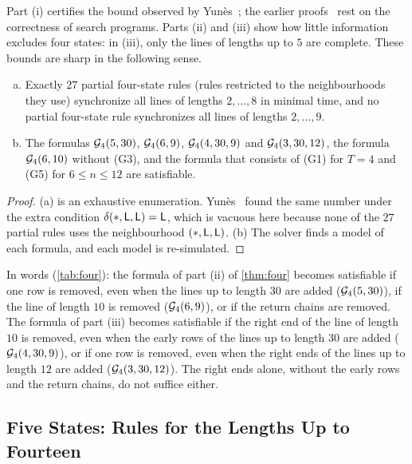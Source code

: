 Part (i) certifies the bound observed by Yun\`es~\cite{Yunes93}; the earlier
proofs~\cite{Balzer67,Yunes93,Sanders94} rest on the correctness of search
programs. Parts (ii) and (iii) show how little information excludes four
states: in (iii), only the lines of lengths up to $5$ are complete. These
bounds are sharp in the following sense.

\begin{proposition}\label{prop:sharp}
\leavevmode
\begin{enumerate}[(a)]
\item Exactly $27$ partial four-state rules (rules restricted to the
neighbourhoods they use) synchronize all lines of lengths $2,\dots,8$ in
minimal time, and no partial four-state rule synchronizes all lines of lengths
$2,\dots,9$.
\item The formulas $\mathcal G_4(5,30)$, $\mathcal G_4(6,9)$, $\mathcal G_4(4,30,9)$ and
$\mathcal G_4(3,30,12)$, the formula $\mathcal G_4(6,10)$ without (G3), and the formula that
consists of (G1) for $T=4$ and (G5) for $6\le n\le12$ are satisfiable.
\end{enumerate}
\end{proposition}

\begin{proof}
(a) is an exhaustive enumeration. Yun\`es~\cite{Yunes93} found the same number
under the extra condition $\delta(\ast,\mathsf L,\mathsf L)=\mathsf L$, which is vacuous here
because none of the $27$ partial rules uses the neighbourhood $(\ast,\mathsf L,\mathsf L)$.
(b) The solver finds a model of each formula, and each model is re-simulated.
\end{proof}

In words (\cref{tab:four}): the formula of part (ii) of \cref{thm:four}
becomes satisfiable if one row is removed, even when the lines up to length $30$ are added
($\mathcal G_4(5,30)$), if the line of length $10$ is removed ($\mathcal G_4(6,9)$), or if the
return chains are removed. The formula of part (iii) becomes satisfiable if
the right end of the line of length $10$ is removed, even when the early rows
of the lines up to length $30$ are added ($\mathcal G_4(4,30,9)$), or if one row is
removed, even when the right ends of the lines up to length $12$ are added
($\mathcal G_4(3,30,12)$). The right ends alone, without the early rows and the return
chains, do not suffice either.

\subsection{Five States: Rules for the Lengths Up to Fourteen}\label{sec:five}

